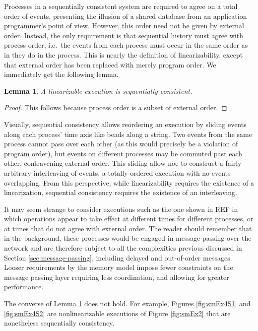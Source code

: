 \documentclass[]             %
{NASA}                       %
\newtheorem{lemma}[theorem]{Lemma}
\theoremstyle{definition}
\begin{document}
\afterpage{\clearpage}

Processes in a sequentially consistent system are required to agree on
a total order of events, presenting the illusion of a shared database
from an application programmer's point of view. However, this order
need not be given by external order. Instead, the only requirement is
that sequential history must agree with process order, i.e.~the events
from each process must occur in the same order as in they do in the
process.  This is nearly the definition of linearizability, except
that external order has been replaced with merely program order. We
immediately get the following lemma.

\begin{lemma}
  \label{lem:linearsequential}
  A linearizable execution is sequentially consistent.
\end{lemma}
\begin{proof}
  This follows because process order is a subset of external order.
\end{proof}

Visually, sequential consistency allows reordering an execution by
sliding events along each process' time axis like beads along a
string.  Two events from the same process cannot pass over each other
(as this would precisely be a violation of program order), but events
on different processes may be commuted past each other, contravening
external order. This sliding allow noe to construct a fairly arbitrary
interleaving of events, a totally ordered execution with no events
overlapping. From this perspective, while linearizability requires the
existence of a linearization, sequential consistency requires the
existence of an interleaving.

It may seem strange to consider executions such as the one shown in
REF in which operations appear to take effect at different times for
different processes, or at times that do not agree with external
order. The reader should remember that in the background, these
processes would be engaged in message-passing over the network and are
therefore subject to all the complexities previous discussed in
Section \ref{sec:message-passing}, including delayed and out-of-order
messages. Looser requirements by the memory model impose fewer
constraints on the message passing layer requiring less coordination,
and allowing for greater performance.

The converse of Lemma \ref{lem:linearsequential} does not hold. For
example, Figures \ref{fig:smEx4S1} and \ref{fig:smEx4S2} are
nonlinearizable executions of Figure \ref{fig:smEx2} that are
nonetheless sequentially consistency.
\end{document}
